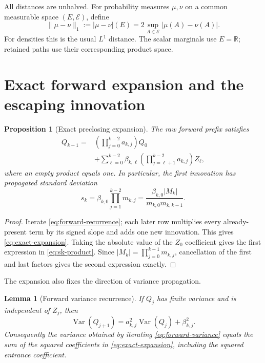 \documentclass[11pt]{article}
\newtheorem{proposition}[theorem]{Proposition}
\newtheorem{lemma}[theorem]{Lemma}
\theoremstyle{definition}
\theoremstyle{remark}
\newcommand{\R}{\mathbb R}
\begin{document}
All distances are unhalved.  For probability measures $\mu,\nu$ on a common
measurable space $(E,\mathcal E)$, define
\begin{equation}\label{eq:unhalved}
 \|\mu-\nu\|_1:=|\mu-\nu|(E)
 =2\sup_{A\in\mathcal E}|\mu(A)-\nu(A)|.
\end{equation}
For densities this is the usual $L^1$ distance.  The scalar marginals use
$E=\R$; retained paths use their corresponding product space.

\section{Exact forward expansion and the escaping innovation}

\begin{proposition}[Exact preclosing expansion]\label{prop:expansion}
The raw forward prefix satisfies
\begin{align}
 Q_{k-1}
 ={}&\left(\prod_{j=0}^{k-2}a_{k,j}\right)Q_0 \nonumber\\
 &+\sum_{\ell=0}^{k-2}
 \beta_{k,\ell}
 \left(\prod_{j=\ell+1}^{k-2}a_{k,j}\right)Z_{\ell},
 \label{eq:exact-expansion}
\end{align}
where an empty product equals one.  In particular, the first innovation has
propagated standard deviation
\begin{equation}\label{eq:sk-product}
 \boxed{
 s_k=\beta_{k,0}\prod_{j=1}^{k-2}m_{k,j}
 =\frac{\beta_{k,0}|M_k|}{m_{k,0}m_{k,k-1}}.}
\end{equation}
\end{proposition}

\begin{proof}
Iterate \eqref{eq:forward-recurrence}; each later row multiplies every
already-present term by its signed slope and adds one new innovation.  This
gives \eqref{eq:exact-expansion}.  Taking the absolute value of the
$Z_0$ coefficient gives the first expression in \eqref{eq:sk-product}.
Since $|M_k|=\prod_{j=0}^{k-1}m_{k,j}$, cancellation of the first and last
factors gives the second expression exactly.
\end{proof}

The expansion also fixes the direction of variance propagation.

\begin{lemma}[Forward variance recurrence]\label{lem:forward-variance}
If $Q_j$ has finite variance and is independent of $Z_j$, then
\begin{equation}\label{eq:forward-variance}
 \boxed{
 \operatorname{Var}(Q_{j+1})
 =a_{k,j}^2\operatorname{Var}(Q_j)+\beta_{k,j}^2.}
\end{equation}
Consequently the variance obtained by iterating \eqref{eq:forward-variance}
equals the sum of the squared coefficients in \eqref{eq:exact-expansion},
including the squared entrance coefficient.
\end{lemma}
\end{document}

